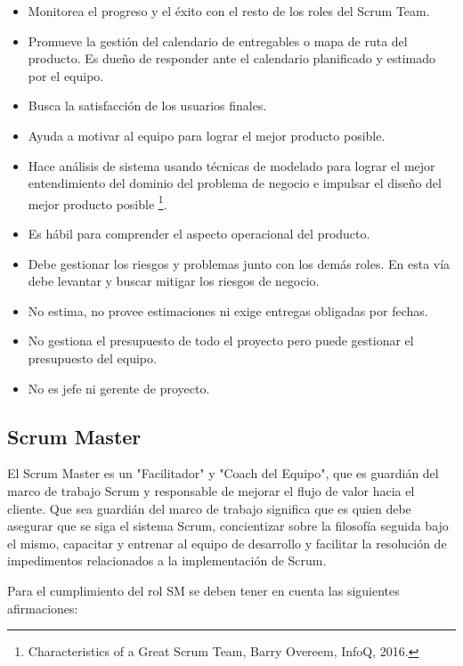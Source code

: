 \begin{itemize}
\item Monitorea el progreso y el éxito con el resto de los roles del Scrum Team. 
\item Promueve la gestión del calendario de entregables o mapa de ruta del producto. Es dueño de responder ante el calendario planificado y estimado por el equipo.
\item Busca la satisfacción de los usuarios finales.
\item Ayuda a motivar al equipo para lograr el mejor producto posible.
\item Hace análisis de sistema usando técnicas de modelado para lograr el mejor entendimiento del dominio del problema de negocio e impulsar el diseño del mejor producto posible \footnote{Characteristics of a Great Scrum Team, Barry Overeem, InfoQ, 2016.}.
\item Es hábil para comprender el aspecto operacional del producto.
\item Debe gestionar los riesgos y problemas junto con los demás roles. En esta vía debe levantar y buscar mitigar los riesgos de negocio.
\item No estima, no provee estimaciones ni exige entregas obligadas por fechas.
\item No gestiona el presupuesto de todo el proyecto pero puede gestionar el presupuesto del equipo.
\item No es jefe ni gerente de proyecto.
\end{itemize}

\subsection{Scrum Master}

El Scrum Master es un "Facilitador" y "Coach del Equipo", que es guardián del marco de trabajo Scrum y responsable de mejorar el flujo de valor hacia el cliente. Que sea guardián del marco de trabajo significa que es quien debe asegurar que se siga el sistema Scrum, concientizar sobre la filosofía seguida bajo el mismo, capacitar y entrenar al equipo de desarrollo y facilitar la resolución de impedimentos relacionados a la implementación de Scrum.

Para el cumplimiento del rol SM se deben tener en cuenta las siguientes afirmaciones:

